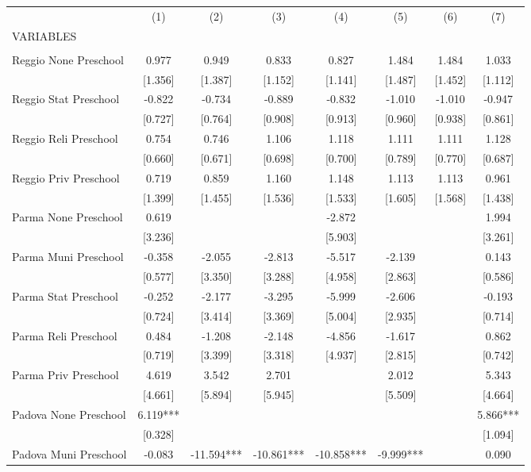 \begin{tabular}{lccccccc} \hline
 & (1) & (2) & (3) & (4) & (5) & (6) & (7) \\
VARIABLES &  &  &  &  &  &  &  \\ \hline
 &  &  &  &  &  &  &  \\
Reggio None Preschool & 0.977 & 0.949 & 0.833 & 0.827 & 1.484 & 1.484 & 1.033 \\
 & [1.356] & [1.387] & [1.152] & [1.141] & [1.487] & [1.452] & [1.112] \\
Reggio Stat Preschool & -0.822 & -0.734 & -0.889 & -0.832 & -1.010 & -1.010 & -0.947 \\
 & [0.727] & [0.764] & [0.908] & [0.913] & [0.960] & [0.938] & [0.861] \\
Reggio Reli Preschool & 0.754 & 0.746 & 1.106 & 1.118 & 1.111 & 1.111 & 1.128 \\
 & [0.660] & [0.671] & [0.698] & [0.700] & [0.789] & [0.770] & [0.687] \\
Reggio Priv Preschool & 0.719 & 0.859 & 1.160 & 1.148 & 1.113 & 1.113 & 0.961 \\
 & [1.399] & [1.455] & [1.536] & [1.533] & [1.605] & [1.568] & [1.438] \\
Parma None Preschool & 0.619 &  &  & -2.872 &  &  & 1.994 \\
 & [3.236] &  &  & [5.903] &  &  & [3.261] \\
Parma Muni Preschool & -0.358 & -2.055 & -2.813 & -5.517 & -2.139 &  & 0.143 \\
 & [0.577] & [3.350] & [3.288] & [4.958] & [2.863] &  & [0.586] \\
Parma Stat Preschool & -0.252 & -2.177 & -3.295 & -5.999 & -2.606 &  & -0.193 \\
 & [0.724] & [3.414] & [3.369] & [5.004] & [2.935] &  & [0.714] \\
Parma Reli Preschool & 0.484 & -1.208 & -2.148 & -4.856 & -1.617 &  & 0.862 \\
 & [0.719] & [3.399] & [3.318] & [4.937] & [2.815] &  & [0.742] \\
Parma Priv Preschool & 4.619 & 3.542 & 2.701 &  & 2.012 &  & 5.343 \\
 & [4.661] & [5.894] & [5.945] &  & [5.509] &  & [4.664] \\
Padova None Preschool & 6.119*** &  &  &  &  &  & 5.866*** \\
 & [0.328] &  &  &  &  &  & [1.094] \\
Padova Muni Preschool & -0.083 & -11.594*** & -10.861*** & -10.858*** & -9.999*** &  & 0.090 \\

\end{tabular}
